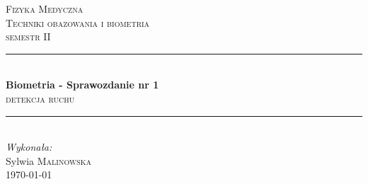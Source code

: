 	
	\begin{titlepage}
		
		\newcommand{\HRule}{\rule{\linewidth}{0.5mm}} %
		
		\center %
		
		
		\textsc{\LARGE Fizyka Medyczna}\\[1.5cm] %
		\textsc{\Large Techniki obazowania i biometria}\\[0.5cm] %
		\textsc{\large semestr II}\\[0.5cm] %
		
		
		\HRule \\[0.4cm]
		{ \huge \bfseries Biometria - Sprawozdanie nr 1}\\[0.4cm] %
		\textsc{\large detekcja ruchu}\\[0.5cm]
		\HRule \\[1.5cm]
		
		\Large \emph{Wykonała:}\\
		Sylwia \textsc{Malinowska}\\[3cm] %
		
		
		{\large \today}\\[2cm] %

		\vfill %
		
	\end{titlepage}
	

